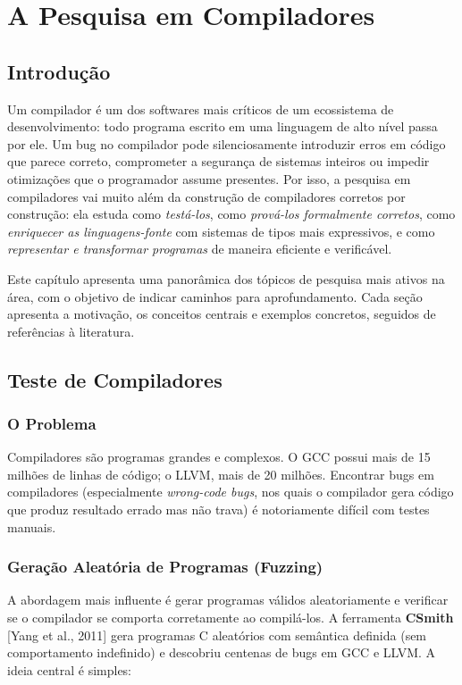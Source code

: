 \chapter{A Pesquisa em Compiladores}

\section{Introdução}

Um compilador é um dos softwares mais críticos de um ecossistema de
desenvolvimento: todo programa escrito em uma linguagem de alto nível
passa por ele. Um bug no compilador pode silenciosamente introduzir
erros em código que parece correto, comprometer a segurança de sistemas
inteiros ou impedir otimizações que o programador assume presentes.
Por isso, a pesquisa em compiladores vai muito além da construção de
compiladores corretos por construção: ela estuda como \emph{testá-los},
como \emph{prová-los formalmente corretos}, como \emph{enriquecer as
linguagens-fonte} com sistemas de tipos mais expressivos, e como
\emph{representar e transformar programas} de maneira eficiente e
verificável.

Este capítulo apresenta uma panorâmica dos tópicos de pesquisa mais
ativos na área, com o objetivo de indicar caminhos para aprofundamento.
Cada seção apresenta a motivação, os conceitos centrais e exemplos
concretos, seguidos de referências à literatura.

\section{Teste de Compiladores}

\subsection{O Problema}

Compiladores são programas grandes e complexos. O GCC possui mais de
15 milhões de linhas de código; o LLVM, mais de 20 milhões. Encontrar
bugs em compiladores (especialmente \emph{wrong-code bugs}, nos quais
o compilador gera código que produz resultado errado mas não trava)
é notoriamente difícil com testes manuais.

\subsection{Geração Aleatória de Programas (Fuzzing)}

A abordagem mais influente é gerar programas válidos aleatoriamente e
verificar se o compilador se comporta corretamente ao compilá-los. A
ferramenta \textbf{CSmith} [Yang et al., 2011] gera programas C
aleatórios com semântica definida (sem comportamento indefinido) e
descobriu centenas de bugs em GCC e LLVM. A ideia central é simples:

